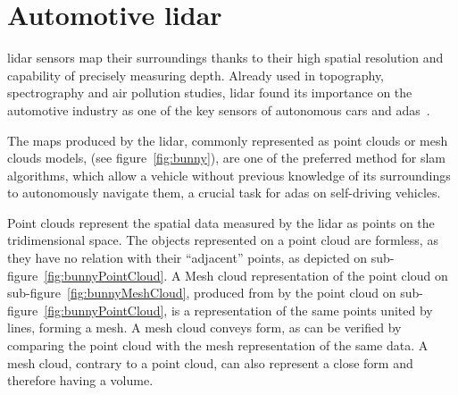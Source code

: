 \section{Automotive \ac{lidar}}
\label{sec:sota:automotive-lidar}
\ac{lidar} sensors map their surroundings thanks to their high spatial resolution and capability of precisely measuring depth. Already used in topography, spectrography and air pollution studies, \ac{lidar} found its importance on the automotive industry as one of the key sensors of autonomous cars and \ac{adas}~\cite{Sullivan2016}. 

The maps produced by the \ac{lidar}, commonly represented as point clouds or mesh clouds models, (see figure~\ref{fig:bunny}), are one of the preferred method for \ac{slam} algorithms, which allow a vehicle without previous knowledge of its surroundings to autonomously navigate them, a crucial task for \ac{adas} on self-driving vehicles.

Point clouds represent the spatial data measured by the \ac{lidar} as points on the tridimensional space. The objects represented on a point cloud are formless, as they have no relation with their ``adjacent'' points, as depicted on sub-figure~\ref{fig:bunnyPointCloud}. A Mesh cloud representation of the point cloud on sub-figure~\ref{fig:bunnyMeshCloud}, produced from by the point cloud on sub-figure~\ref{fig:bunnyPointCloud}, is a representation of the same points united by lines, forming a mesh. A mesh cloud conveys form, as can be verified by comparing the point cloud with the mesh representation of the same data. A mesh cloud, contrary to a point cloud, can also represent a close form and therefore having a volume.

